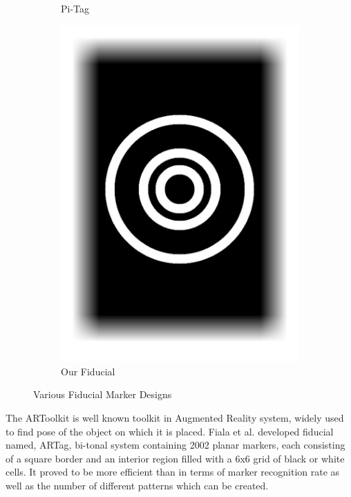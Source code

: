 \documentclass[runningheads]{llncs}
\begin{document}
\begin{figure}
\begin{subfigure}[b]{0.19\textwidth}
  \caption{Pi-Tag}  
 \end{subfigure}
 \begin{subfigure}[b]{0.19\textwidth}
  \centering
  \includegraphics[width=\linewidth]{newconcentric_01.pdf}
  \caption{Our Fiducial}  
 \end{subfigure}
 \caption{Various Fiducial Marker Designs}
 \label{fig:previous_work}  
\end{figure}
 
The ARToolkit \cite{ARToolkit02} \cite{kato-artoolkit} is well known toolkit in
Augmented Reality system, widely used to find pose of the object on which it is
placed.  Fiala et al. \cite{Fiala05} developed fiducial named, ARTag, bi-tonal
system containing 2002 planar markers, each consisting of a square border and
an interior region filled with a 6x6 grid of black or white cells. It proved to
be more efficient than \cite{ARToolkit02} in terms of marker recognition rate
as well as the number of different patterns which can be created.  
\end{document}

